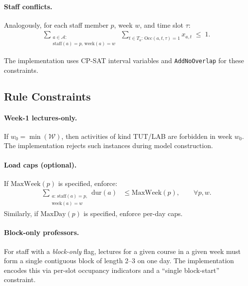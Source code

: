 \paragraph{Staff conflicts.}
Analogously, for each staff member $p$, week $w$, and time slot $\tau$:
\begin{align}
\sum_{\substack{a\in\mathcal{A}:\\ \mathrm{staff}(a)=p,\,\mathrm{week}(a)=w}}
\;\sum_{t\in T_a:\,\mathrm{Occ}(a,t,\tau)=1} x_{a,t} \;\le\; 1.
\end{align}

The implementation uses CP-SAT interval variables and \texttt{AddNoOverlap} for these constraints.

\subsection{Rule Constraints}
\paragraph{Week-1 lectures-only.}
If $w_0=\min(\mathcal{W})$, then activities of kind TUT/LAB are forbidden in week $w_0$.
The implementation rejects such instances during model construction.

\paragraph{Load caps (optional).}
If $\mathrm{MaxWeek}(p)$ is specified, enforce:
\begin{align}
\sum_{\substack{a:\,\mathrm{staff}(a)=p,\\\mathrm{week}(a)=w}}
\mathrm{dur}(a) &\le \mathrm{MaxWeek}(p),
\qquad \forall p,w.
\end{align}
Similarly, if $\mathrm{MaxDay}(p)$ is specified, enforce per-day caps.

\paragraph{Block-only professors.}
For staff with a \emph{block-only} flag, lectures for a given course in a given week must form a single contiguous block of length 2--3 on one day.
The implementation encodes this via per-slot occupancy indicators and a ``single block-start'' constraint.

